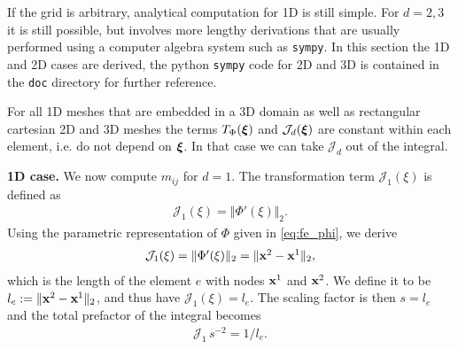 If the grid is arbitrary, analytical computation for 1D is still simple. For $d=2,3$ it is still possible, but involves more lengthy derivations that are usually performed using a computer algebra system such as \verb|sympy|. In this section the 1D and 2D cases are derived, the python \verb|sympy| code for 2D and 3D is contained in the \verb|doc| directory for further reference.

For all 1D meshes that are embedded in a 3D domain as well as rectangular cartesian 2D and 3D meshes the terms $T_\Phi(\boldsymbol{\xi})$ and $\mathcal{J}_d(\boldsymbol{\xi})$ are constant within each element, i.e. do not depend on $\boldsymbol{\xi}$. In that case we can take $\mathcal{J}_d$ out of the integral.

\textbf{1D case.}
We now compute $m_{ij}$ for $d=1$. The transformation term $\mathcal{J}_1(\xi)$
is defined as
%
\begin{equation*}
  \begin{array}{lll}
    \mathcal{J}_1(\xi) = \Vert \Phi'(\xi)\Vert_2.
  \end{array}
\end{equation*}
Using the parametric representation of $\Phi$ given in \eqref{eq:fe_phi}, we derive
%
\begin{equation*}
  \begin{array}{lll}
    \mathcal{J}_1(\xi) = \Vert \Phi'(\xi)\Vert_2 = \Vert \textbf{x}^2 - \textbf{x}^1 \Vert_2,
  \end{array}
\end{equation*}
which is the length of the element $e$ with nodes $\textbf{x}^1$ and $\textbf{x}^2$. We define it to be $l_e := \Vert\textbf{x}^2-\textbf{x}^1\Vert_2$, and thus have $\mathcal{J}_1(\xi) = l_e$. The scaling factor is then $s = l_e$ and the total prefactor of the integral becomes
\begin{equation*}
  \begin{array}{lll}
    \mathcal{J}_1\,s^{-2} = 1/l_e.
  \end{array}
\end{equation*}




